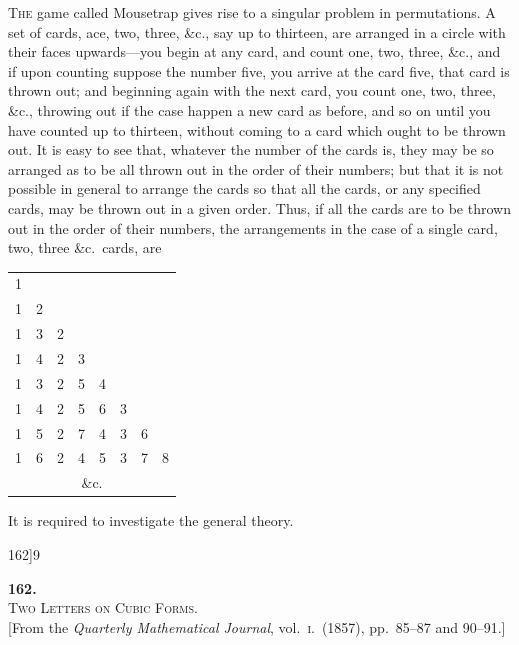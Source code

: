 \documentclass[11pt]{article}
\begin{document}
\textsc{The} game called Mousetrap gives rise to a singular problem in permutations. A
set of cards, ace, two, three, \&c., say up to thirteen, are arranged in a circle with
their faces upwards---you begin at any card, and count one, two, three, \&c., and if
upon counting suppose the number five, you arrive at the card five, that card is
thrown out; and beginning again with the next card, you count one, two, three, \&c.,
throwing out if the case happen a new card as before, and so on until you have
counted up to thirteen, without coming to a card which ought to be thrown out.
It is easy to see that, whatever the number of the cards is, they may be so arranged
as to be all thrown out in the order of their numbers; but that it is not possible
in general to arrange the cards so that all the cards, or any specified cards, may be
thrown out in a given order. Thus, if all the cards are to be thrown out in the
order of their numbers, the arrangements in the case of a single card, two, three \&c.\
cards, are
\begin{center}
\begin{tabular}{cccccccc}
1 & & & & & & & \\
1 & 2 & & & & & & \\
1 & 3 & 2 & & & & & \\
1 & 4 & 2 & 3 & & & & \\
1 & 3 & 2 & 5 & 4 & & & \\
1 & 4 & 2 & 5 & 6 & 3 & & \\
1 & 5 & 2 & 7 & 4 & 3 & 6 & \\
1 & 6 & 2 & 4 & 5 & 3 & 7 & 8\\
\multicolumn{8}{c}{\&c.}
\end{tabular}
\end{center}
It is required to investigate the general theory.

\newpage

\begin{center}
\small 162]\hfill\textsc{9}
\end{center}

\vspace{4em}

\begin{center}
{\large\textbf{162.}}\\[1em]
{\large\scshape Two Letters on Cubic Forms.}\\[1em]
{\small [From the \textit{Quarterly Mathematical Journal}, vol.~\textsc{i}.\ (1857), pp.~85--87 and 90--91.]}
\end{center}
\end{document}
